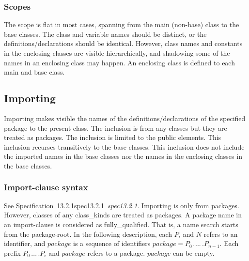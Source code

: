 \documentclass[10pt,b5paper]{article}
\def\specrefx#1#2{Specification~#1\ifx\relax#2\relax{}\else~{\it{}#2}\fi}
\def\specref#1{\specrefx{#1}{\csname spec#1\endcsname}}
\begin{document}
\subsubsection*{Scopes}

The scope is flat in most cases, spanning from the main (non-base)
class to the base classes.  The class and variable names should be
distinct, or the definitions/declarations should be identical.
However, class names and constants in the enclosing classes are
visible hierarchically, and shadowing some of the names in an
enclosing class may happen.  An enclosing class is defined to each
main and base class.


\subsection{Importing}

\def\baseimport{This inclusion recurses transitively to the base
classes}

\def\noimport{This inclusion does not include the imported names in
the base classes nor the names in the enclosing classes in the base
classes}

Importing makes visible the names of the definitions/declarations of
the specified package to the present class.  The inclusion is from any
classes but they are treated as packages.  The inclusion is limited to
the public elements. \baseimport. \noimport.

\subsubsection*{Import-clause syntax}

See \specref{13.2.1}.  Importing is only from packages.  However,
classes of any class_kinds are treated as packages.  A package name in
an import-clause is considered as fully_qualified.  That is, a name
search starts from the package-root.  In the following description,
each $P_i$ and $N$ refers to an identifier, and $\mathit{package}$ is
a sequence of identifiers $\mathit{package}={P_0.\,...\,.P_{n-1}}$.
Each prefix $P_0\,...\,.P_i$ and $\mathit{package}$ refers to a
package.  $\mathit{package}$ can be empty.
\end{document}
